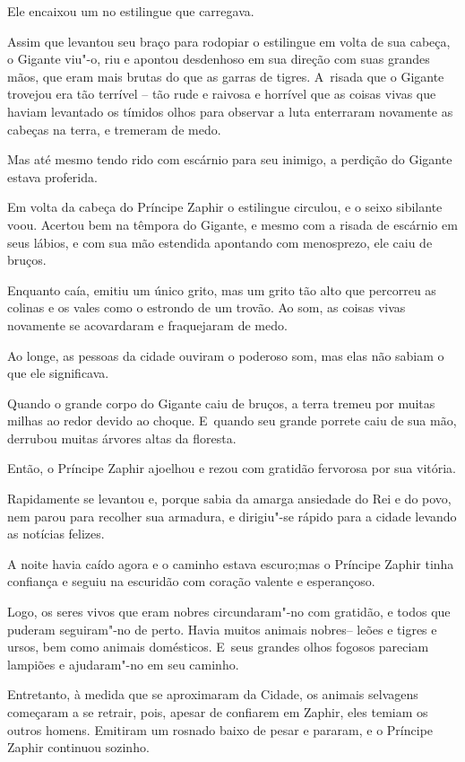 Ele encaixou um no estilingue que carregava.

Assim que levantou seu braço para rodopiar o estilingue em volta de sua
cabeça, o Gigante viu"-o, riu e apontou desdenhoso em sua direção com
suas grandes mãos, que eram mais brutas do que as garras de tigres. A~risada que o Gigante trovejou era tão terrível -- tão rude e raivosa e
horrível que as coisas vivas que haviam levantado os tímidos olhos para
observar a luta enterraram novamente as cabeças na terra, e tremeram de
medo.

Mas até mesmo tendo rido com escárnio para seu inimigo, a perdição do
Gigante estava proferida.

Em volta da cabeça do Príncipe Zaphir o estilingue circulou, e o seixo
sibilante voou. Acertou bem na têmpora do Gigante, e mesmo com a risada
de escárnio em seus lábios, e com sua mão estendida apontando com
menosprezo, ele caiu de bruços.

Enquanto caía, emitiu um único grito, mas um grito tão alto que
percorreu as colinas e os vales como o estrondo de um trovão. Ao som, as
coisas vivas novamente se acovardaram e fraquejaram de medo.

Ao longe, as pessoas da cidade ouviram o poderoso som, mas elas não
sabiam o que ele significava.

Quando o grande corpo do Gigante caiu de bruços, a terra tremeu por
muitas milhas ao redor devido ao choque. E~quando seu grande porrete
caiu de sua mão, derrubou muitas árvores altas da floresta.

Então, o Príncipe Zaphir ajoelhou e rezou com gratidão fervorosa por sua
vitória.

Rapidamente se levantou e, porque sabia da amarga ansiedade do Rei e do
povo, nem parou para recolher sua armadura, e dirigiu"-se rápido para a
cidade levando as notícias felizes.

A noite havia caído agora e o caminho estava escuro;mas o Príncipe
Zaphir tinha confiança e seguiu na escuridão com coração valente e
esperançoso.

Logo, os seres vivos que eram nobres circundaram"-no com gratidão, e
todos que puderam seguiram"-no de perto. Havia muitos animais nobres--
leões e tigres e ursos, bem como animais domésticos. E~seus grandes
olhos fogosos pareciam lampiões e ajudaram"-no em seu caminho.

Entretanto, à medida que se aproximaram da Cidade, os animais selvagens
começaram a se retrair, pois, apesar de confiarem em Zaphir, eles temiam
os outros homens. Emitiram um rosnado baixo de pesar e pararam, e o
Príncipe Zaphir continuou sozinho.

